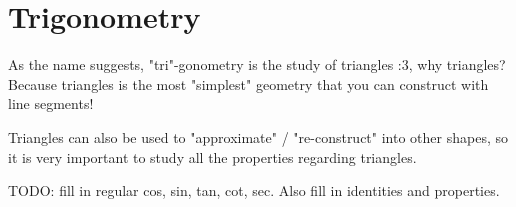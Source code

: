 \chapter{Trigonometry}
As the name suggests, "tri"-gonometry is the study of triangles :3, why triangles?
Because triangles is the most "simplest" geometry that you can construct with line segments!

Triangles can also be used to "approximate" / "re-construct" into other shapes, so it is very
important to study all the properties regarding triangles.

TODO:
fill in regular cos, sin, tan, cot, sec. Also fill in identities and properties.


